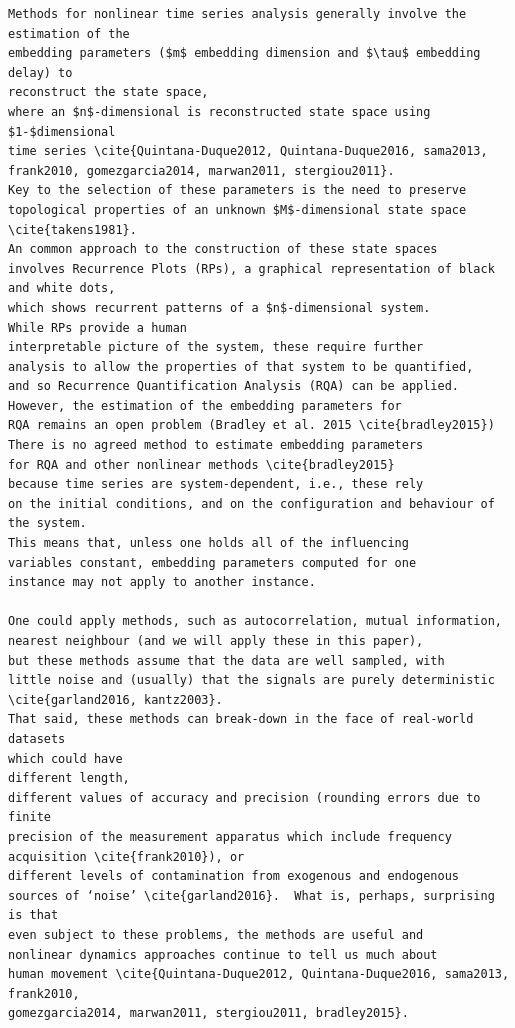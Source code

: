 \documentclass[10pt]{article}
\begin{document}
\begin{verbatim}
Methods for nonlinear time series analysis generally involve the estimation of the 
embedding parameters ($m$ embedding dimension and $\tau$ embedding delay) to 
reconstruct the state space,
where an $n$-dimensional is reconstructed state space using $1-$dimensional 
time series \cite{Quintana-Duque2012, Quintana-Duque2016, sama2013, 
frank2010, gomezgarcia2014, marwan2011, stergiou2011}.
Key to the selection of these parameters is the need to preserve 
topological properties of an unknown $M$-dimensional state space \cite{takens1981}.
An common approach to the construction of these state spaces 
involves Recurrence Plots (RPs), a graphical representation of black and white dots, 
which shows recurrent patterns of a $n$-dimensional system.
While RPs provide a human
interpretable picture of the system, these require further
analysis to allow the properties of that system to be quantified,
and so Recurrence Quantification Analysis (RQA) can be applied.
However, the estimation of the embedding parameters for
RQA remains an open problem (Bradley et al. 2015 \cite{bradley2015})
There is no agreed method to estimate embedding parameters
for RQA and other nonlinear methods \cite{bradley2015} 
because time series are system-dependent, i.e., these rely
on the initial conditions, and on the configuration and behaviour of the system.  
This means that, unless one holds all of the influencing 
variables constant, embedding parameters computed for one 
instance may not apply to another instance.   

One could apply methods, such as autocorrelation, mutual information, 
nearest neighbour (and we will apply these in this paper), 
but these methods assume that the data are well sampled, with 
little noise and (usually) that the signals are purely deterministic \cite{garland2016, kantz2003}.
That said, these methods can break-down in the face of real-world datasets 
which could have 
different length, 
different values of accuracy and precision (rounding errors due to finite 
precision of the measurement apparatus which include frequency 
acquisition \cite{frank2010}), or 
different levels of contamination from exogenous and endogenous 
sources of ‘noise’ \cite{garland2016}.  What is, perhaps, surprising is that 
even subject to these problems, the methods are useful and 
nonlinear dynamics approaches continue to tell us much about 
human movement \cite{Quintana-Duque2012, Quintana-Duque2016, sama2013, frank2010,
gomezgarcia2014, marwan2011, stergiou2011, bradley2015}.


\end{verbatim}
\end{document}
